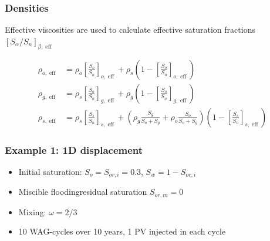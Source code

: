 \documentclass[screen, aspectratio=43]{beamer}
\DeclareMathOperator{\eff}{eff}
\begin{document}
\begin{frame}
  \frametitle{Densities}
  \vspace{0.2cm}

 
  Effective viscosities are used to calculate effective saturation fractions
  $[S_\alpha/S_n]_{\beta,\eff}$

  \begin{align*}
    \rho_{o,\eff} & = \rho_o\left[\frac{S_o}{S_n}\right]_{o,\eff} + \rho_s\left(1 - \left[\frac{S_o}{S_n}\right]_{o,\eff}\right) \\
    \rho_{g,\eff} & = \rho_s\left[\frac{S_o}{S_n}\right]_{g,\eff} + \rho_g\left(1 - \left[\frac{S_o}{S_n}\right]_{g,\eff}\right) \\
    \rho_{s,\eff} & = \rho_s\left[\frac{S_s}{S_n}\right]_{s,\eff}
                    + \left(\rho_g\frac{S_g}{S_o + S_g} + \rho_o\frac{S_o}{S_o + S_g}\right)\left(1 - \left[\frac{S_s}{S_n}\right]_{s,\eff}\right)
  \end{align*}
  
\end{frame}

\begin{frame}
  
  
\end{frame}

\begin{frame}
  \frametitle{Example 1: 1D displacement}
  \begin{itemize}
  \item Initial saturation: $S_o = S_{or,i} = 0.3$, $S_w = 1 - S_{or, i}$
  \item Miscible floodingresidual saturation $S_{or,m}= 0$
  \item Mixing: $\omega = 2/3$
  \item 10 WAG-cycles over 10 years, 1 PV injected in each cycle
  \end{itemize}
\end{frame}
\end{document}
